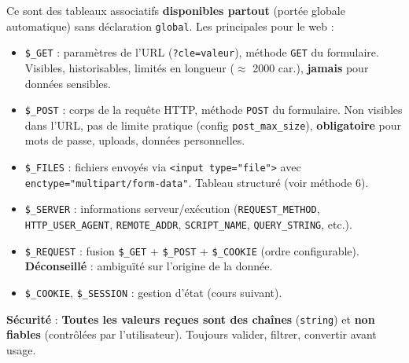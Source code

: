 \documentclass[11pt]{article}
\begin{document}
\begin{definition}
Ce sont des tableaux associatifs \textbf{disponibles partout} (portée globale automatique) sans déclaration \texttt{global}. Les principales pour le web :
\begin{itemize}
  \item \texttt{\$\_GET} : paramètres de l'URL (\texttt{?cle=valeur}), méthode \texttt{GET} du formulaire. Visibles, historisables, limités en longueur ($\approx$ 2000 car.), \textbf{jamais} pour données sensibles.
  \item \texttt{\$\_POST} : corps de la requête HTTP, méthode \texttt{POST} du formulaire. Non visibles dans l'URL, pas de limite pratique (config \texttt{post\_max\_size}), \textbf{obligatoire} pour mots de passe, uploads, données personnelles.
  \item \texttt{\$\_FILES} : fichiers envoyés via \texttt{<input type="file">} avec \texttt{enctype="multipart/form-data"}. Tableau structuré (voir méthode 6).
  \item \texttt{\$\_SERVER} : informations serveur/exécution (\texttt{REQUEST\_METHOD}, \texttt{HTTP\_USER\_AGENT}, \texttt{REMOTE\_ADDR}, \texttt{SCRIPT\_NAME}, \texttt{QUERY\_STRING}, etc.).
  \item \texttt{\$\_REQUEST} : fusion \texttt{\$\_GET} + \texttt{\$\_POST} + \texttt{\$\_COOKIE} (ordre configurable). \textbf{Déconseillé} : ambiguïté sur l'origine de la donnée.
  \item \texttt{\$\_COOKIE}, \texttt{\$\_SESSION} : gestion d'état (cours suivant).
\end{itemize}
\textbf{Sécurité} : \textbf{Toutes les valeurs reçues sont des chaînes} (\texttt{string}) et \textbf{non fiables} (contrôlées par l'utilisateur). Toujours valider, filtrer, convertir avant usage.
\end{definition}
\end{document}

